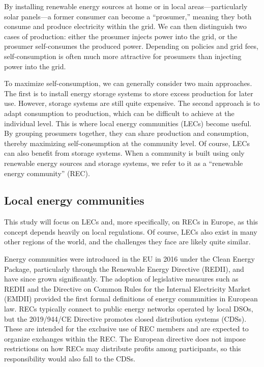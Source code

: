 \documentclass[12pt,a4paper]{article}
\begin{document}
By installing renewable energy sources at home or in local areas—particularly solar panels—a former consumer can become a “prosumer,” meaning they both consume and produce electricity within the grid. We can then distinguish two cases of production: either the prosumer injects power into the grid, or the prosumer self-consumes the produced power. Depending on policies and grid fees, self-consumption is often much more attractive for prosumers than injecting power into the grid.

To maximize self-consumption, we can generally consider two main approaches. The first is to install energy storage systems to store excess production for later use. However, storage systems are still quite expensive. The second approach is to adapt consumption to production, which can be difficult to achieve at the individual level. This is where local energy communities (LECs) become useful. By grouping prosumers together, they can share production and consumption, thereby maximizing self-consumption at the community level. Of course, LECs can also benefit from storage systems. When a community is built using only renewable energy sources and storage systems, we refer to it as a “renewable energy community” (REC).

\subsection{Local energy communities}



This study will focus on LECs and, more specifically, on RECs in Europe, as this concept depends heavily on local regulations. Of course, LECs also exist in many other regions of the world, and the challenges they face are likely quite similar.

Energy communities were introduced in the EU in 2016 under the Clean Energy Package, particularly through the Renewable Energy Directive (REDII), and have since grown significantly. The adoption of legislative measures such as REDII and the Directive on Common Rules for the Internal Electricity Market (EMDII) provided the first formal definitions of energy communities in European law. RECs typically connect to public energy networks operated by local DSOs, but the 2019/944/CE Directive promotes closed distribution systems (CDSs). These are intended for the exclusive use of REC members and are expected to organize exchanges within the REC. The European directive does not impose restrictions on how RECs may distribute profits among participants, so this responsibility would also fall to the CDSs.
\end{document}
